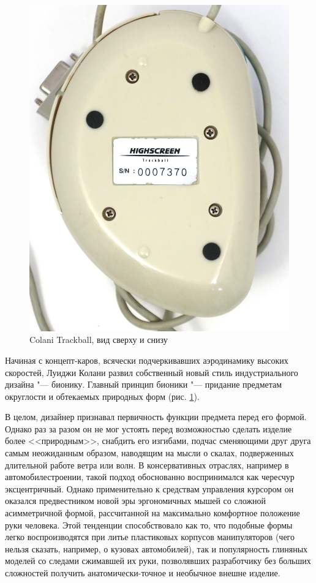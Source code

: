 \documentclass[11pt, a4paper]{article}
\begin{document}
\begin{figure}[h]
    \includegraphics[scale=0.39]{1993_colani_trackball/bottom_w_30.jpg}

    \caption{Colani Trackball, вид сверху и снизу}
    \label{fig:ColaniTopBottom}
\end{figure}

Начиная с концепт-каров, всячески подчеркивавших аэродинамику высоких скоростей, Луиджи Колани развил собственный новый стиль индустриального дизайна "--- бионику. Главный принцип бионики "--- придание предметам округлости и обтекаемых природных форм (рис. \ref{fig:ColaniTopBottom}).

В целом, дизайнер признавал первичность функции предмета перед его формой. Однако раз за разом он не мог устоять перед возможностью сделать изделие более <<природным>>, снабдить его изгибами, подчас сменяющими друг друга самым неожиданным образом, наводящим на мысли о скалах, подверженных длительной работе ветра или волн. В консервативных отраслях, например в автомобилестроении, такой подход обоснованно воспринимался как чересчур эксцентричный. Однако применительно к средствам управления курсором он оказался предвестником новой эры эргономичных мышей со сложной асимметричной формой, рассчитанной на максимально комфортное положение руки человека. Этой тенденции способствовало как то, что подобные формы легко воспроизводятся при литье пластиковых корпусов манипуляторов (чего нельзя сказать, например, о кузовах автомобилей), так и популярность глиняных моделей со следами сжимавшей их руки, позволявших разработчику без больших сложностей получить анатомически-точное и необычное внешне изделие.
\end{document}
